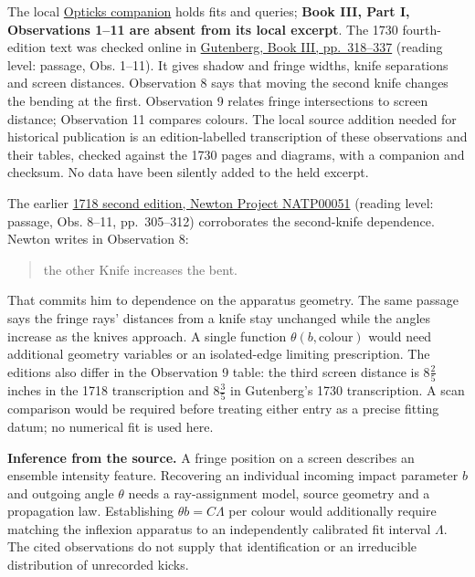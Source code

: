 \documentclass[11pt,a4paper]{article}
\begin{document}
The local
\href{../docs/classics/Newton_Opticks_1730_fits_and_queries.md}{Opticks
companion} holds fits and queries; \textbf{Book III, Part I,
Observations 1--11 are absent from its local excerpt}. The 1730
fourth-edition text was checked online in
\href{https://www.gutenberg.org/files/33504/33504-h/33504-h.htm}{Gutenberg,
Book III, pp.~318--337} (reading level: passage, Obs. 1--11). It gives
shadow and fringe widths, knife separations and screen distances.
Observation 8 says that moving the second knife changes the bending at
the first. Observation 9 relates fringe intersections to screen
distance; Observation 11 compares colours. The local source addition
needed for historical publication is an edition-labelled transcription
of these observations and their tables, checked against the 1730 pages
and diagrams, with a companion and checksum. No data have been silently
added to the held excerpt.

The earlier
\href{https://www.newtonproject.ox.ac.uk/view/texts/diplomatic/NATP00051}{1718
second edition, Newton Project NATP00051} (reading level: passage, Obs.
8--11, pp.~305--312) corroborates the second-knife dependence. Newton
writes in Observation 8:

\begin{quote}
the other Knife increases the bent.
\end{quote}

That commits him to dependence on the apparatus geometry. The same
passage says the fringe rays' distances from a knife stay unchanged
while the angles increase as the knives approach. A single function
\(\theta(b,\mathrm{colour})\) would need additional geometry variables
or an isolated-edge limiting prescription. The editions also differ in
the Observation 9 table: the third screen distance is \(8\frac25\)
inches in the 1718 transcription and \(8\frac35\) in Gutenberg's 1730
transcription. A scan comparison would be required before treating
either entry as a precise fitting datum; no numerical fit is used here.

\textbf{Inference from the source.} A fringe position on a screen
describes an ensemble intensity feature. Recovering an individual
incoming impact parameter \(b\) and outgoing angle \(\theta\) needs a
ray-assignment model, source geometry and a propagation law.
Establishing \(\theta b=C\Lambda\) per colour would additionally require
matching the inflexion apparatus to an independently calibrated fit
interval \(\Lambda\). The cited observations do not supply that
identification or an irreducible distribution of unrecorded kicks.
\end{document}

